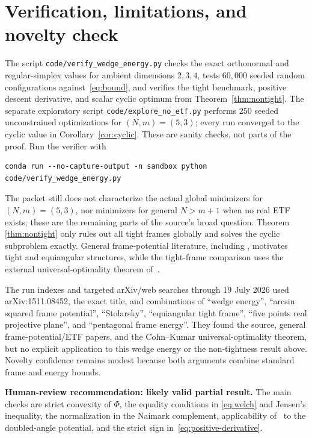 \documentclass[11pt]{article}
\begin{document}
\section{Verification, limitations, and novelty check}

The script \texttt{code/verify\_wedge\_energy.py} checks the exact orthonormal
and regular-simplex values for ambient dimensions $2,3,4$, tests $60{,}000$
seeded random configurations against~\eqref{eq:bound}, and verifies the tight
benchmark, positive descent derivative, and scalar cyclic optimum from
Theorem~\ref{thm:nontight}.  The separate exploratory script
\texttt{code/explore\_no\_etf.py} performs $250$ seeded unconstrained
optimizations for $(N,m)=(5,3)$; every run converged to the cyclic value in
Corollary~\ref{cor:cyclic}.  These are sanity checks, not parts of the proof.
Run the verifier with
\begin{verbatim}
conda run --no-capture-output -n sandbox python code/verify_wedge_energy.py
\end{verbatim}

The packet still does not characterize the actual global minimizers for
$(N,m)=(5,3)$, nor minimizers for general $N>m+1$ when no real ETF exists;
these are the remaining parts of the source's broad question.  Theorem
\ref{thm:nontight} only rules out all tight frames globally and solves the
cyclic subproblem exactly.  General frame-potential literature, including
\cite{BF,BH}, motivates tight and equiangular structures, while the
tight-frame comparison uses the external universal-optimality theorem
of~\cite{CK}.

The run indexes and targeted arXiv/web searches through 19 July 2026 used
arXiv:1511.08452, the exact title, and combinations of ``wedge energy'',
``arcsin squared frame potential'', ``Stolarsky'', ``equiangular tight
frame'', ``five points real projective plane'', and ``pentagonal frame
energy''.  They found the source, general frame-potential/ETF papers, and the
Cohn--Kumar universal-optimality theorem, but no explicit application to this
wedge energy or the non-tightness result above.  Novelty confidence remains
modest because both arguments combine standard frame and energy bounds.

\textbf{Human-review recommendation: likely valid partial result.}  The main
checks are strict convexity of $\Phi$, the equality conditions in
\eqref{eq:welch} and Jensen's inequality, the normalization in the Naimark
complement, applicability of~\cite{CK} to the doubled-angle potential, and the
strict sign in~\eqref{eq:positive-derivative}.
\end{document}
